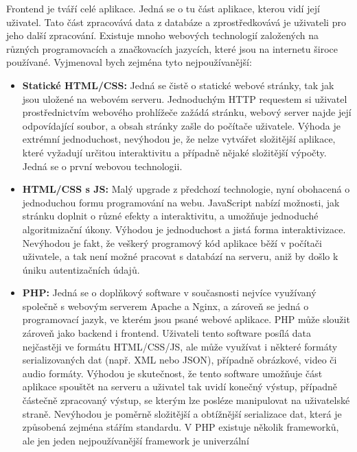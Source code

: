 Frontend je tváří celé aplikace. Jedná se o tu část aplikace, kterou vidí
její uživatel. Tato část zpracovává data z databáze a zprostředkovává je
uživateli pro jeho další zpracování. Existuje mnoho webových technologií
založených na různých programovacích a značkovacích jazycích, které jsou
na internetu široce používané. Vyjmenoval bych zejména tyto nejpoužívanější:

\begin{itemize}
    \item \textbf{Statické HTML/CSS:} Jedná se čistě o statické webové
        stránky, tak jak jsou uložené na webovém serveru. Jednoduchým
        HTTP requestem si uživatel prostřednictvím webového prohlížeče
        zažádá stránku, webový server najde její odpovídající soubor,
        a obsah stránky zašle do počítače uživatele. Výhoda je extrémní
        jednoduchost, nevýhodou je, že nelze vytvářet složitější aplikace,
        které vyžadují určitou interaktivitu a případně nějaké složitější
        výpočty. Jedná se o první webovou technologii.
    \item \textbf{HTML/CSS s JS:} Malý upgrade z předchozí technologie,
        nyní obohacená o jednoduchou formu programování na webu. JavaScript
        nabízí možnosti, jak stránku doplnit o různé efekty a interaktivitu,
        a umožňuje jednoduché algoritmizační úkony. Výhodou je jednoduchost
        a jistá forma interaktivizace. Nevýhodou je fakt, že veškerý
        programový kód aplikace běží v počítači uživatele, a tak není možné
        pracovat s databází na serveru, aniž by došlo k úniku autentizačních
        údajů.
    \item \textbf{PHP:} Jedná se o doplňkový software v současnosti nejvíce
        využívaný společně s webovým serverem Apache a Nginx, a zároveň
        se jedná o programovací jazyk, ve kterém jsou psané webové aplikace.
        PHP může sloužit zároveň jako backend i frontend. Uživateli tento
        software posílá data nejčastěji ve formátu HTML/CSS/JS, ale může
        využívat i některé formáty serializovaných dat (např. XML nebo JSON),
        případně obrázkové, video či audio formáty. Výhodou je skutečnost,
        že tento software umožňuje část aplikace spouštět na serveru
        a uživatel tak uvidí konečný výstup, případně částečně zpracovaný
        výstup, se kterým lze posléze manipulovat na uživatelské straně.
        Nevýhodou je poměrně složitější a obtížnější serializace dat, která
        je způsobená zejména stářím standardu. V PHP existuje několik
        frameworků, ale jen jeden nejpoužívanější framework je univerzální

\end{itemize}
